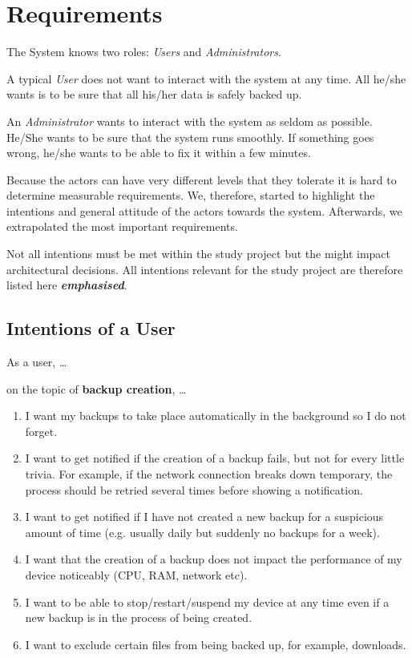 \newcommand{\relevantreq}[1]{\textit{\textbf{#1}}}
\newcommand{\enumcountsave}{\setcounter{listcounter}{\value{enumi}}}
\newcommand{\enumcountrestore}{\setcounter{enumi}{\value{listcounter}}}

\section{Requirements}
\label{requirements}
The System knows two roles: \emph{Users} and \emph{Administrators}.

A typical \emph{User} does not want to interact with the system at any time.
All he/she wants is to be sure that all his/her data is safely backed
up.

An \emph{Administrator} wants to interact with the system as seldom as possible.
He/She wants to be sure that the system runs smoothly. If something goes
wrong, he/she wants to be able to fix it within a few minutes.

Because the actors can have very different levels that they tolerate it is hard to
determine measurable requirements. We, therefore, started to highlight the intentions
and general attitude of the actors towards the system. Afterwards, we extrapolated the most
important requirements.

Not all intentions must be met within the study project but the might %
impact architectural decisions. All intentions relevant for the study project are therefore listed here \relevantreq{emphasised}.


\subsection{Intentions of a User}
As a user, \ldots{}

\begin{flushright}
on the topic of \textbf{backup creation}, \ldots{}
\end{flushright}

\begin{enumerate}
	\item	I want my backups to take place automatically in the background so I do not forget.
	\item	I want to get notified if the creation of a backup fails, but not for every little trivia. For example, if the network connection breaks down temporary, the process should be retried several times before showing a notification.
	\item	I want to get notified if I have not created a new backup for a suspicious amount of time (e.g. usually daily but suddenly no backups for a week).
	\item	I want that the creation of a backup does not impact the performance of my device noticeably (CPU, RAM, network etc).
	\item	I want to be able to stop/restart/suspend my device at any time even if a new backup is in the process of being created.
	\item	I want to exclude certain files from being backed up, for example, downloads.
	\enumcountsave
\end{enumerate}

